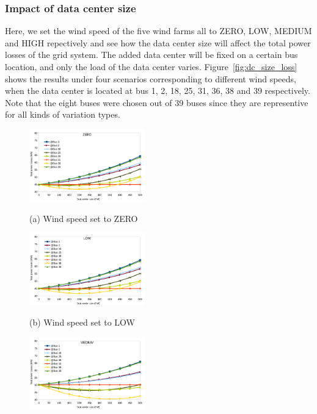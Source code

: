 \subsubsection{Impact of data center size}
Here, we set the wind speed of the five wind farms all to ZERO, LOW, MEDIUM and HIGH repectively and see how the data center size will affect the total power losses of the grid system. The added data center will be fixed on a certain bus location, and only the load of the data center varies. Figure~\ref{fig:dc_size_loss} shows the results under four scenarios corresponding to different wind speeds, when the data center is located at bus 1, 2, 18, 25, 31, 36, 38 and 39 respectively. Note that the eight buses were chosen out of 39 buses since they are representive for all kinds of variation types. 

\begin{figure}[ht]
\begin{minipage}{0.2\linewidth}
  \centerline{\includegraphics[width=5.0cm]{img/size-loss-zero}}
  \centerline{(a) Wind speed set to ZERO}
  \label{fig:a:zero}
\end{minipage}
\hfill
\begin{minipage}{.2\linewidth}
  \centerline{\includegraphics[width=5.0cm]{img/size-loss-low}}
  \centerline{(b) Wind speed set to LOW}
   \label{fig:b:low}
\end{minipage}
\hfill
\begin{minipage}{0.2\linewidth}
  \centerline{\includegraphics[width=5.0cm]{img/size-loss-mid}}

\end{minipage}
\end{figure}
